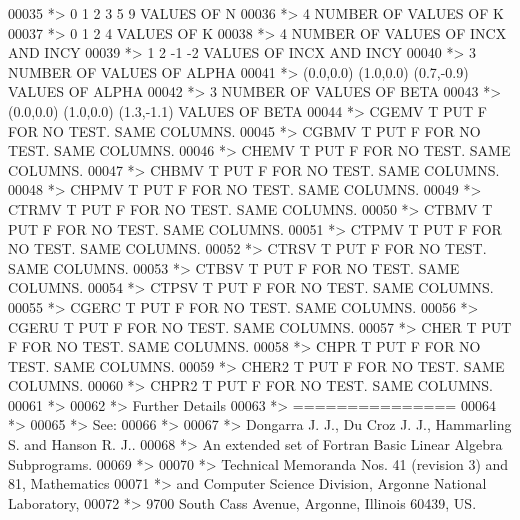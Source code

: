 \begin{DoxyCode}
00035 \textcolor{comment}{*> 0 1 2 3 5 9       VALUES OF N}
00036 \textcolor{comment}{*> 4                 NUMBER OF VALUES OF K}
00037 \textcolor{comment}{*> 0 1 2 4           VALUES OF K}
00038 \textcolor{comment}{*> 4                 NUMBER OF VALUES OF INCX AND INCY}
00039 \textcolor{comment}{*> 1 2 -1 -2         VALUES OF INCX AND INCY}
00040 \textcolor{comment}{*> 3                 NUMBER OF VALUES OF ALPHA}
00041 \textcolor{comment}{*> (0.0,0.0) (1.0,0.0) (0.7,-0.9)       VALUES OF ALPHA}
00042 \textcolor{comment}{*> 3                 NUMBER OF VALUES OF BETA}
00043 \textcolor{comment}{*> (0.0,0.0) (1.0,0.0) (1.3,-1.1)       VALUES OF BETA}
00044 \textcolor{comment}{*> CGEMV  T PUT F FOR NO TEST. SAME COLUMNS.}
00045 \textcolor{comment}{*> CGBMV  T PUT F FOR NO TEST. SAME COLUMNS.}
00046 \textcolor{comment}{*> CHEMV  T PUT F FOR NO TEST. SAME COLUMNS.}
00047 \textcolor{comment}{*> CHBMV  T PUT F FOR NO TEST. SAME COLUMNS.}
00048 \textcolor{comment}{*> CHPMV  T PUT F FOR NO TEST. SAME COLUMNS.}
00049 \textcolor{comment}{*> CTRMV  T PUT F FOR NO TEST. SAME COLUMNS.}
00050 \textcolor{comment}{*> CTBMV  T PUT F FOR NO TEST. SAME COLUMNS.}
00051 \textcolor{comment}{*> CTPMV  T PUT F FOR NO TEST. SAME COLUMNS.}
00052 \textcolor{comment}{*> CTRSV  T PUT F FOR NO TEST. SAME COLUMNS.}
00053 \textcolor{comment}{*> CTBSV  T PUT F FOR NO TEST. SAME COLUMNS.}
00054 \textcolor{comment}{*> CTPSV  T PUT F FOR NO TEST. SAME COLUMNS.}
00055 \textcolor{comment}{*> CGERC  T PUT F FOR NO TEST. SAME COLUMNS.}
00056 \textcolor{comment}{*> CGERU  T PUT F FOR NO TEST. SAME COLUMNS.}
00057 \textcolor{comment}{*> CHER   T PUT F FOR NO TEST. SAME COLUMNS.}
00058 \textcolor{comment}{*> CHPR   T PUT F FOR NO TEST. SAME COLUMNS.}
00059 \textcolor{comment}{*> CHER2  T PUT F FOR NO TEST. SAME COLUMNS.}
00060 \textcolor{comment}{*> CHPR2  T PUT F FOR NO TEST. SAME COLUMNS.}
00061 \textcolor{comment}{*>}
00062 \textcolor{comment}{*> Further Details}
00063 \textcolor{comment}{*> ===============}
00064 \textcolor{comment}{*>}
00065 \textcolor{comment}{*>    See:}
00066 \textcolor{comment}{*>}
00067 \textcolor{comment}{*>       Dongarra J. J., Du Croz J. J., Hammarling S.  and Hanson R. J..}
00068 \textcolor{comment}{*>       An  extended  set of Fortran  Basic Linear Algebra Subprograms.}
00069 \textcolor{comment}{*>}
00070 \textcolor{comment}{*>       Technical  Memoranda  Nos. 41 (revision 3) and 81,  Mathematics}
00071 \textcolor{comment}{*>       and  Computer Science  Division,  Argonne  National Laboratory,}
00072 \textcolor{comment}{*>       9700 South Cass Avenue, Argonne, Illinois 60439, US.}

\end{DoxyCode}
